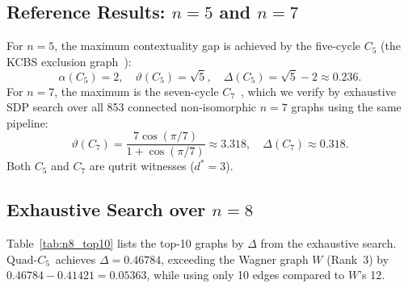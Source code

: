 \documentclass[aps,pra,twocolumn,superscriptaddress,longbibliography,floatfix]{revtex4-2}
\newcommand{\vt}{\vartheta}
\newcommand{\al}{\alpha}
\newcommand{\De}{\Delta}
\newcommand{\QC}{\ensuremath{\text{Quad-}C_5}}
\begin{document}
\subsection{Reference Results: $n=5$ and $n=7$}

For $n=5$, the maximum contextuality gap is achieved by the five-cycle $C_5$
(the KCBS exclusion graph~\cite{Klyachko2008}):
\begin{equation}
  \al(C_5)=2,\quad\vt(C_5)=\sqrt{5},\quad\De(C_5)=\sqrt{5}-2\approx0.236.
\end{equation}
For $n=7$, the maximum is the seven-cycle $C_7$~\cite{Araujo2013}, which
we verify by exhaustive SDP search over all 853 connected non-isomorphic
$n=7$ graphs using the same pipeline:
\begin{equation}
  \vt(C_7)=\frac{7\cos(\pi/7)}{1+\cos(\pi/7)}\approx3.318,\quad
  \De(C_7)\approx0.318.
\end{equation}
Both $C_5$ and $C_7$ are qutrit witnesses ($d^*=3$).

\subsection{Exhaustive Search over $n=8$}

Table~\ref{tab:n8_top10} lists the top-10 graphs by $\De$ from the
exhaustive search.
\QC\ achieves $\De=0.46784$, exceeding the Wagner graph $W$
(Rank~3) by $0.46784-0.41421=0.05363$, while using only 10 edges compared
to $W$'s 12.
\end{document}
